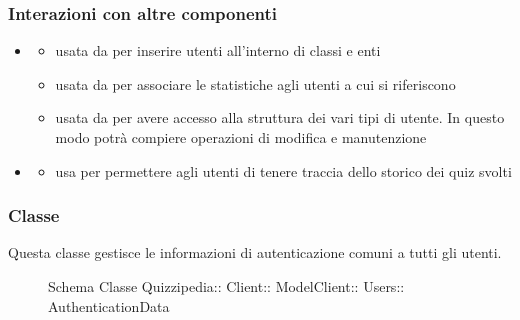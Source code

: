 \subsubsection{Interazioni con altre componenti}
\begin{itemize}
\item {}
\begin{itemize}
\item usata da  per inserire utenti all'interno di classi e enti
\item usata da  per associare le statistiche agli utenti a cui si riferiscono
\item usata da  per avere accesso alla struttura dei vari tipi di utente. In questo modo potrà compiere operazioni di modifica e manutenzione
\end{itemize}
\item {}
\begin{itemize}
\item usa  per permettere agli utenti di tenere traccia dello storico dei quiz svolti
\end{itemize}
\end{itemize}
\subsubsection{Classe }
Questa classe gestisce le informazioni di autenticazione comuni a tutti gli utenti.
\begin{figure}[H]
\centering
\noindent{}
\caption[Schema Classe AuthenticationData]{Schema Classe Quizzipedia:: Client:: ModelClient:: Users:: AuthenticationData}
\end{figure}
